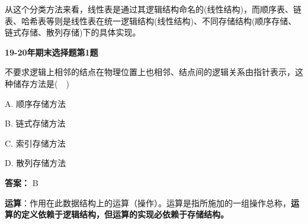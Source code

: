 \documentclass[a4paper]{ltxdoc}
\begin{document}
\par 从这个分类方法来看，线性表是通过其逻辑结构命名的(线性结构)，而顺序表、链表、哈希表等则是线性表在统一逻辑结构(线性结构)、不同存储结构(顺序存储、链式存储、散列存储)下的具体实现。
\begin{framed}
    \textbf{19-20年期末选择题第1题}
    \par 不要求逻辑上相邻的结点在物理位置上也相邻、结点间的逻辑关系由指针表示，这种储存方法是(\ \ )
    \par A. 顺序存储方法
    \par B. 链式存储方法
    \par C. 索引存储方法
    \par D. 散列存储方法
    \par \textbf{答案：} B
\end{framed}
\par \textbf{运算}：作用在此数据结构上的运算（操作）。运算是指所施加的一组操作总称，\textbf{运算的定义依赖于逻辑结构，但运算的实现必依赖于存储结构。}
\end{document}
